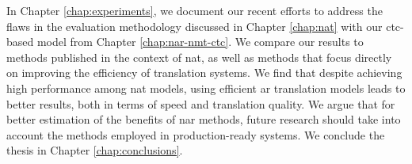 In Chapter \ref{chap:experiments}, we document our recent efforts to address
the flaws in the evaluation methodology discussed in Chapter \ref{chap:nat}
with our \acs{ctc}-based model from Chapter \ref{chap:nar-nmt-ctc}. We compare
our results to methods published in the context of \ac{nat}, as well as methods
that focus directly on improving the efficiency of translation systems.  We
find that despite achieving high performance among \ac{nat} models, using
efficient \acl{ar} translation models leads to better results, both in terms of
speed and translation quality. We argue that for better estimation of the
benefits of \acl{nar} methods, future research should take into account the
methods employed in production-ready systems.
%
We conclude the thesis in Chapter \ref{chap:conclusions}.

